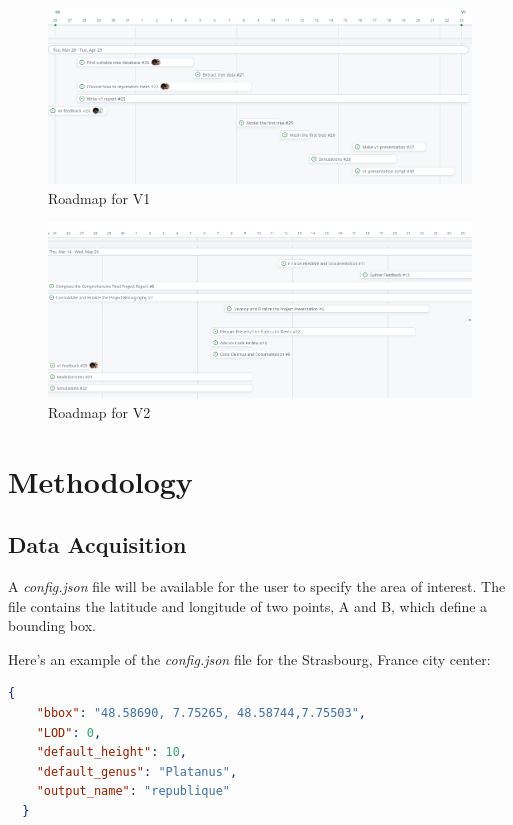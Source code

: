 \documentclass[12pt]{article}
\begin{document}
\begin{figure}[H]
    \centering
    \includegraphics[width=1\textwidth]{images/roadmap_v1.png}
    \caption{Roadmap for V1}
\end{figure}

\begin{figure}[H]
    \centering
    \includegraphics[width=1\textwidth]{images/roadmap_v2.png}
    \caption{Roadmap for V2}
\end{figure}

\newpage

\section{Methodology}

\subsection{Data Acquisition}
A \textit{config.json} file will be available for the user to specify the area of
interest. The file contains the latitude and longitude of two points, A and B,
which define a bounding box.

Here's an example of the \textit{config.json} file for the Strasbourg, France
city center:

\begin{lstlisting}[language=json]
{
    "bbox": "48.58690, 7.75265, 48.58744,7.75503",
    "LOD": 0,
    "default_height": 10,
    "default_genus": "Platanus",
    "output_name": "republique"
  }
\end{lstlisting}
\end{document}
